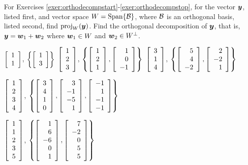 \noindent For Exercises \ref{exer:orthodecompstart}-\ref{exer:orthodecompstop}, for the vector $\bb y$, listed first, and vector space $W = \Span\{\B\}$, where $\B$ is an orthogonal basis, listed second, find $\proj_W(\bb y)$. Find the orthogonal decomposition of $\bb y$, that is, $\bb y = \bb w_1 + \bb w_2$ where $\bb w_1\in W$ and $\bb w_2\in W^\perp$. %
\begin{enumerate}[!HW!, label=$\spadesuit$ \arabic*., ref=\arabic*]
\begin{multicols}{3}
\item\label{exer:orthodecompstart} $\vr{1\\1}$, $\left\{\vr{1\\3}\right\}$
\itemspade $\vr{1\\2\\3}$, $\left\{\vr{1\\2\\1}, \vr{1\\0\\-1}\right\}$
\itemspade $\vr{3\\1\\4}$, $\left\{\vr{5\\4\\-2}, \vr{2\\-2\\1}\right\}$
\end{multicols}
\begin{multicols}{2}
\itemspade $\vr{1\\2\\3\\4}$, $\left\{\vr{3\\4\\1\\0}, \vr{3\\-1\\-5\\1}, \vr{-1\\1\\-1\\-1}\right\}$
\item\label{exer:orthodecompstop} $\vr{1\\1\\2\\3\\5}$, $\left\{\vr{1\\6\\-6\\0\\1}, \vr{7\\-2\\0\\5\\5}\right\}$
\end{multicols}
 \end{enumerate}

